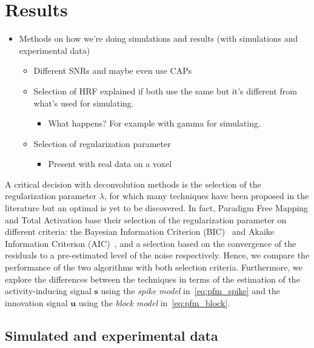 \section{Results}

\begin{itemize}
    \item Methods on how we're doing simulations and results (with simulations and experimental data)
    \begin{itemize}
        \item Different SNRs and maybe even use CAPs
        \item Selection of HRF explained if both use the same but it's different from what's used for simulating.
        \begin{itemize}
            \item What happens? For example with gamma for simulating.
        \end{itemize}
        \item Selection of regularization parameter
        \begin{itemize}
            \item Present with real data on a voxel
        \end{itemize}
    \end{itemize}
\end{itemize}

A critical decision with deconvolution methods is the selection of the regularization parameter \(\lambda\), for which many techniques have been proposed in the literature but an optimal is yet to be discovered. In fact, Paradigm Free Mapping and Total Activation base their selection of the regularization parameter on different criteria: the Bayesian Information Criterion (BIC)~\cite{schwarz1978estimating} and Akaike Information Criterion (AIC)~\cite{akaike1998information}, and a selection based on the convergence of the residuals to a pre-estimated level of the noise respectively. Hence, we compare the performance of the two algorithms with both selection criteria. Furthermore, we explore the differences between the techniques in terms of the estimation of the activity-inducing signal \(\mathbf{s}\) using the \textit{spike model} in~\eqref{eq:pfm_spike} and the innovation signal \(\mathbf{u}\) using the \textit{block model} in~\eqref{eq:pfm_block}.

\subsection{Simulated and experimental data}
\label{sec:data}

